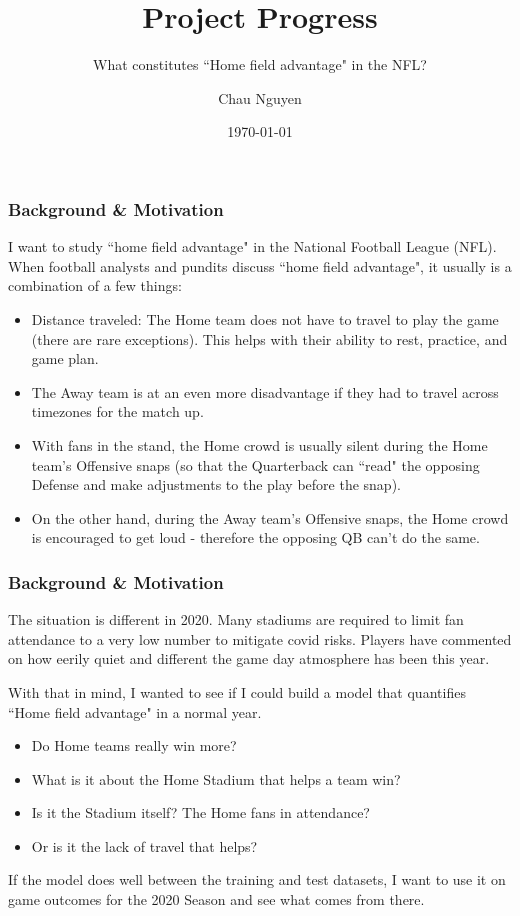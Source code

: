 \documentclass[t]{beamer}
\title{Project Progress}
\subtitle{What constitutes ``Home field advantage" in the NFL?}
\author{Chau Nguyen}
\date{\today}
\begin{document}
\frame{\titlepage}

\begin{frame}
\frametitle{Background \& Motivation}
 {I want to study ``home field advantage" in the National Football League (NFL). When football analysts and pundits discuss ``home field advantage", it usually is a combination of a few things:}
\pause
\begin{itemize}
	\item<2->{Distance traveled: The Home team does not have to travel to play the game (there are rare exceptions). This helps with their ability to rest, practice, and game plan.}
	\item<3->{The Away team is at an even more disadvantage if they had to travel across timezones for the match up.}
	\item<4->{With fans in the stand, the Home crowd is usually silent during the Home team's Offensive snaps (so that the Quarterback can ``read" the opposing Defense and make adjustments to the play before the snap).}
	\item<5->{On the other hand, during the Away team's Offensive snaps, the Home crowd is encouraged to get loud - therefore the opposing QB can't do the same.}
\end{itemize}
\end{frame}
\begin{frame}
\frametitle{Background \& Motivation}
The situation is different in 2020. Many stadiums are required to limit fan attendance to a very low number to mitigate covid risks. Players have commented on how eerily quiet and different the game day atmosphere has been this year. 


With that in mind, I wanted to see if I could build a model that quantifies ``Home field advantage" in a normal year. 
\begin{itemize}
\item<1->{Do Home teams really win more?}
\item<2->{What is it about the Home Stadium that helps a team win?}
\item<3->{Is it the Stadium itself? The Home fans in attendance?}
\item<4->{Or is it the lack of travel that helps?}
\end{itemize}

{If the model does well between the training and test datasets, I want to use it on game outcomes for the 2020 Season and see what comes from there.}


\end{frame}
\end{document}
